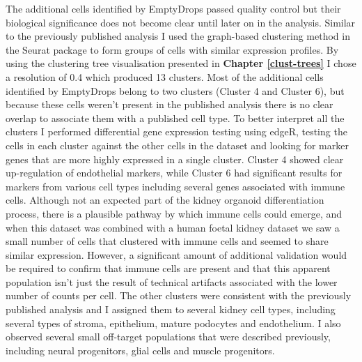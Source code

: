 \documentclass[11pt,a4paper,titlepage,twoside,openright]{style/unimelbthesis}
\theoremstyle{definition}
\theoremstyle{definition}
\theoremstyle{definition}
\theoremstyle{remark}
\begin{document}
\begin{mainmatter}
The additional cells identified by EmptyDrops passed quality control but their biological significance does not become clear until later on in the analysis. Similar to the previously published analysis I used the graph-based clustering method in the Seurat package to form groups of cells with similar expression profiles. By using the clustering tree visualisation presented in \textbf{Chapter \ref{clust-trees}} I chose a resolution of 0.4 which produced 13 clusters. Most of the additional cells identified by EmptyDrops belong to two clusters (Cluster 4 and Cluster 6), but because these cells weren't present in the published analysis there is no clear overlap to associate them with a published cell type. To better interpret all the clusters I performed differential gene expression testing using edgeR, testing the cells in each cluster against the other cells in the dataset and looking for marker genes that are more highly expressed in a single cluster. Cluster 4 showed clear up-regulation of endothelial markers, while Cluster 6 had significant results for markers from various cell types including several genes associated with immune cells. Although not an expected part of the kidney organoid differentiation process, there is a plausible pathway by which immune cells could emerge, and when this dataset was combined with a human foetal kidney dataset we saw a small number of cells that clustered with immune cells and seemed to share similar expression. However, a significant amount of additional validation would be required to confirm that immune cells are present and that this apparent population isn't just the result of technical artifacts associated with the lower number of counts per cell. The other clusters were consistent with the previously published analysis and I assigned them to several kidney cell types, including several types of stroma, epithelium, mature podocytes and endothelium. I also observed several small off-target populations that were described previously, including neural progenitors, glial cells and muscle progenitors.


\end{mainmatter}
\end{document}
